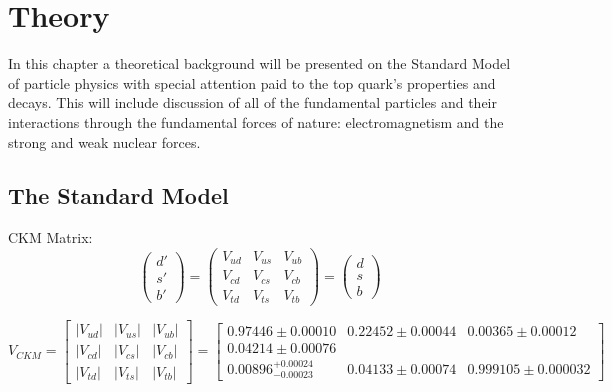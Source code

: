 
\chapter{Theory}
\label{ch:Theory}

In this chapter a theoretical background will be presented on the Standard Model of particle physics with special attention paid to the top quark's properties and decays.  This will include discussion of all of the fundamental particles and their interactions through the fundamental forces of nature: electromagnetism and the strong and weak nuclear forces.

\section{The Standard Model}

CKM Matrix\cite{PDG2018}:
\[
\begin{pmatrix}
d' \\ s' \\ b'
\end{pmatrix}
=
\begin{pmatrix}
V_{ud} & V_{us} & V_{ub} \\
V_{cd} & V_{cs} & V_{cb} \\
V_{td} & V_{ts} & V_{tb} 
\end{pmatrix}
= 
\begin{pmatrix}
d \\ s \\ b
\end{pmatrix}
\]


\[
V_{CKM} = 
\begin{bmatrix}
|V_{ud}| & |V_{us}| & |V_{ub}| \\
|V_{cd}| & |V_{cs}| & |V_{cb}| \\
|V_{td}| & |V_{ts}| & |V_{tb}| 
\end{bmatrix}
= 
\begin{bmatrix}
0.97446 \pm 0.00010 & 0.22452 \pm 0.00044 & 0.00365 \pm 0.00012 \\ 0.04214 \pm 0.00076 \\
0.00896^{+0.00024}_{-0.00023} & 0.04133 \pm 0.00074 & 0.999105 \pm 0.000032 
\end{bmatrix}
\]


